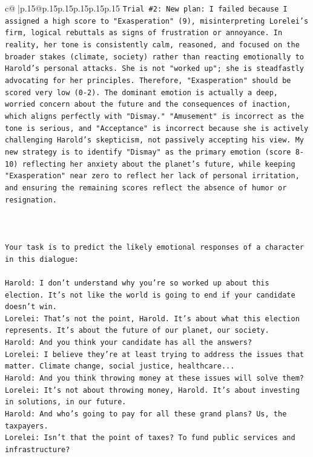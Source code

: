 \documentclass{article}
\begin{document}
{\begin{supertabular}{c@{$\;$}|p{.15\linewidth}@{}p{.15\linewidth}p{.15\linewidth}p{.15\linewidth}p{.15\linewidth}p{.15\linewidth}}
{{{\texttt{Trial \#2: New plan: I failed because I assigned a high score to "Exasperation" (9), misinterpreting Lorelei's firm, logical rebuttals as signs of frustration or annoyance. In reality, her tone is consistently calm, reasoned, and focused on the broader stakes (climate, society) rather than reacting emotionally to Harold's personal attacks. She is not "worked up"; she is steadfastly advocating for her principles. Therefore, "Exasperation" should be scored very low (0{-}2). The dominant emotion is actually a deep, worried concern about the future and the consequences of inaction, which aligns perfectly with "Dismay." "Amusement" is incorrect as the tone is serious, and "Acceptance" is incorrect because she is actively challenging Harold's skepticism, not passively accepting his view. My new strategy is to identify "Dismay" as the primary emotion (score 8{-}10) reflecting her anxiety about the planet's future, while keeping "Exasperation" near zero to reflect her lack of personal irritation, and ensuring the remaining scores reflect the absence of humor or resignation.} \\
\\ 
\\ 
\\ 
\texttt{Your task is to predict the likely emotional responses of a character in this dialogue:} \\
\\ 
\texttt{Harold: I don't understand why you're so worked up about this election. It's not like the world is going to end if your candidate doesn't win.} \\
\texttt{Lorelei: That's not the point, Harold. It's about what this election represents. It's about the future of our planet, our society.} \\
\texttt{Harold: And you think your candidate has all the answers? } \\
\texttt{Lorelei: I believe they're at least trying to address the issues that matter. Climate change, social justice, healthcare...} \\
\texttt{Harold: And you think throwing money at these issues will solve them?} \\
\texttt{Lorelei: It's not about throwing money, Harold. It's about investing in solutions, in our future.} \\
\texttt{Harold: And who's going to pay for all these grand plans? Us, the taxpayers. } \\
\texttt{Lorelei: Isn't that the point of taxes? To fund public services and infrastructure?} \\
}}}
\end{supertabular}}
\end{document}

